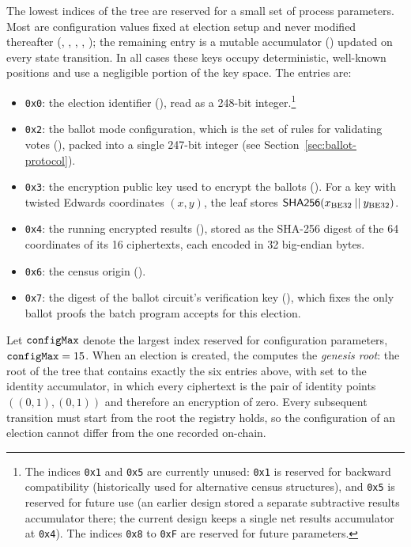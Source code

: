 The lowest indices of the tree are reserved for a small set of process parameters. Most are configuration values fixed at election setup and never modified thereafter
(\processid, \ballotmode, \epk, \censusorigin, \ballotvkhash); the remaining entry is a mutable accumulator (\encresults) updated on every state transition. In all cases these keys
occupy deterministic, well-known positions and use a negligible portion of the key space. The entries are:
\begin{itemize}
	\item \texttt{0x0}: the election identifier (\processid), read as a 248-bit integer.\footnote{The indices \texttt{0x1} and \texttt{0x5} are currently unused: \texttt{0x1} is
		reserved for backward compatibility (historically used for alternative census structures),
		and \texttt{0x5} is reserved for future use (an earlier design stored a separate subtractive
		results accumulator there; the current design keeps a single net results accumulator at
		\texttt{0x4}). The indices \texttt{0x8} to \texttt{0xF} are reserved for future parameters.}
	\item \texttt{0x2}: the ballot mode configuration, which is the set of rules for validating votes (\ballotmode), packed into a single 247-bit integer (see Section~\ref{sec:ballot-protocol}).
	\item \texttt{0x3}: the encryption public key used to encrypt the ballots (\epk). For a key with twisted Edwards coordinates $(x,y)$, the leaf stores ${\sf{SHA256}}(x_{\text{BE32}} \:||\: y_{\text{BE32}})$.
	\item \texttt{0x4}: the running encrypted results (\encresults), stored as the SHA-256 digest of the 64 coordinates of its 16 ciphertexts, each encoded in 32 big-endian bytes.
	\item \texttt{0x6}: the census origin (\censusorigin).
	\item \texttt{0x7}: the digest of the ballot circuit's verification key (\ballotvkhash), which fixes the only ballot proofs the batch program accepts for this election.
\end{itemize}
Let $\texttt{configMax}$ denote the largest index reserved for configuration parameters, $\texttt{configMax} = 15$. When an election is created, the \processregistry computes the \emph{genesis root}: the root of the tree that contains exactly the six entries above, with \encresults set to the identity accumulator, in which every ciphertext is the pair of identity points $((0,1),(0,1))$ and therefore an encryption of zero. Every subsequent transition must start from the root the registry holds, so the configuration of an election cannot differ from the one recorded on-chain.


